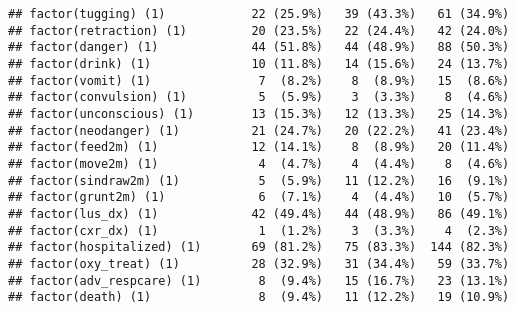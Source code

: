 \documentclass[
]{article}
\begin{document}
\begin{verbatim}
## factor(tugging) (1)            22 (25.9%)   39 (43.3%)   61 (34.9%)
## factor(retraction) (1)         20 (23.5%)   22 (24.4%)   42 (24.0%)
## factor(danger) (1)             44 (51.8%)   44 (48.9%)   88 (50.3%)
## factor(drink) (1)              10 (11.8%)   14 (15.6%)   24 (13.7%)
## factor(vomit) (1)               7  (8.2%)    8  (8.9%)   15  (8.6%)
## factor(convulsion) (1)          5  (5.9%)    3  (3.3%)    8  (4.6%)
## factor(unconscious) (1)        13 (15.3%)   12 (13.3%)   25 (14.3%)
## factor(neodanger) (1)          21 (24.7%)   20 (22.2%)   41 (23.4%)
## factor(feed2m) (1)             12 (14.1%)    8  (8.9%)   20 (11.4%)
## factor(move2m) (1)              4  (4.7%)    4  (4.4%)    8  (4.6%)
## factor(sindraw2m) (1)           5  (5.9%)   11 (12.2%)   16  (9.1%)
## factor(grunt2m) (1)             6  (7.1%)    4  (4.4%)   10  (5.7%)
## factor(lus_dx) (1)             42 (49.4%)   44 (48.9%)   86 (49.1%)
## factor(cxr_dx) (1)              1  (1.2%)    3  (3.3%)    4  (2.3%)
## factor(hospitalized) (1)       69 (81.2%)   75 (83.3%)  144 (82.3%)
## factor(oxy_treat) (1)          28 (32.9%)   31 (34.4%)   59 (33.7%)
## factor(adv_respcare) (1)        8  (9.4%)   15 (16.7%)   23 (13.1%)
## factor(death) (1)               8  (9.4%)   11 (12.2%)   19 (10.9%)
\end{verbatim}

\newpage
\end{document}
